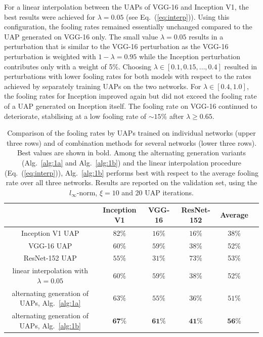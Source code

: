 \documentclass[runningheads]{llncs}
\begin{document}
For a linear interpolation between the UAPs of VGG-16 and Inception V1, the best results were achieved for \(\lambda=0.05\) (see Eq.~(\ref{eq:interp})). Using this configuration, the fooling rates remained essentially unchanged compared to the UAP generated on VGG-16 only.
The small value \(\lambda=0.05\) results in a perturbation that is similar to the VGG-16 perturbation as the VGG-16 perturbation is weighted with \(1-\lambda=0.95\) while the Inception perturbation contributes only with a weight of 5\%. Choosing \(\lambda\in\left[0.1,0.15,\ldots,0.4\right]\) resulted in perturbations with lower fooling rates for both models with respect to the rates achieved by separately training UAPs on the two networks. For \(\lambda \in\left[0.4,1.0\right]\), the fooling rates for Inception improved again but did not exceed the fooling rate of a UAP generated on Inception itself. The fooling rate on VGG-16 continued to deteriorate, stabilising at a low fooling rate of \(\sim 15\%\) after \(\lambda\geq 0.65\).
\begin{table}
\centering

\begin{tabular}{|c|c|c|c|c|c|}
\hline
											&	Inception	V1&	VGG-16		&	ResNet-152	& Average	\\ \hline
Inception V1 UAP							&	\(82\%\)		&	\(16\%\)	&	\(16\%\)	&38\%	\\
VGG-16 UAP								&	\(60\%\)		&	\(59\%\)	&	\(38\%\)	&52\%	\\
ResNet-152 UAP &	\(55\%\)		&	\(31\%\)	&	\(73\%\)&53\%		\\ \hline
linear interpolation with \(\lambda=0.05\)	&	\(60\%\)		&	\(59\%\)	&	\(38\%\)	&52\%\\
alternating generation of UAPs, Alg.~\ref{alg:1a}&	\(63\%\)		&	\(55\%\)	&	\(36\%\)	& \(51\%\)	\\
alternating generation of UAPs, Alg.~\ref{alg:1b}&	\(\mathbf{67}\%\)		&	\(\mathbf{61}\%\)	&	\(\mathbf{41}\%\)		&\(\mathbf{56}\)\%\\
\hline 
\end{tabular}

\caption{Comparison of the fooling rates by UAPs trained on individual networks (upper three rows) and of combination methods for several networks (lower three rows). Best values are shown in bold. Among the alternating generation variants (Alg.~\ref{alg:1a} and Alg.~\ref{alg:1b}) and the linear interpolation procedure (Eq.~(\ref{eq:interp})), Alg.~\ref{alg:1b} performs best with respect to the average fooling rate over all three networks. Results are reported on the validation set, using the $l_\infty$-norm, $\xi=10$ and 20 UAP iterations.}\label{tab:vergleich_comb}
\end{table}
\end{document}
